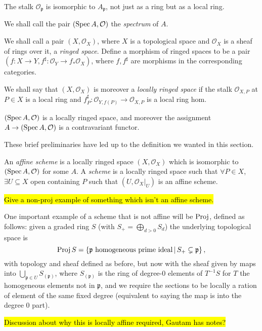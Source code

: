 \documentclass[000-main.tex]{subfiles}
\begin{document}
\begin{lemma}
  The stalk $\mathcal{O}_{\mathfrak{p}}$ is isomorphic to $A_{\mathfrak{p}}$, not just as a ring but as a local ring.
\end{lemma}

We shall call the pair $(\operatorname{Spec} A, \mathcal{O})$ the \emph{spectrum} of $A$. 

\begin{definition}
  We shall call a pair $(X, \mathcal{O}_X)$, where $X$ is a topological space and $\mathcal{O}_X$ is a sheaf of rings over it, a \emph{ringed space}.
  Define a morphism of ringed spaces to be a pair $(f : X \to Y, f^\sharp : \mathcal{O}_Y \to f_\ast \mathcal{O}_X)$, where $f, f^\sharp$ are morphisms in the corresponding categories.

  We shall say that $(X, \mathcal{O}_X)$ is moreover a \emph{locally ringed space} if the stalk $\mathcal{O}_{X, P}$ at $P \in X$ is a local ring and $f^\sharp_P : \mathcal{O}_{Y, f(P)} \to \mathcal{O}_{X, P}$ is a local ring hom.
\end{definition}

\begin{example}
  $(\operatorname{Spec} A, \mathcal{O})$ is a locally ringed space, and moreover the assignment $A \to (\operatorname{Spec} A , \mathcal{O})$ is a contravariant functor.
\end{example}

These brief preliminaries have led up to the definition we wanted in this section. 

\begin{definition}
  An \emph{affine scheme} is a locally ringed space $(X, \mathcal{O}_X)$ which is isomorphic to $(\operatorname{Spec} A, \mathcal{O})$ for some $A$.
  A \emph{scheme} is a locally ringed space such that $\forall P \in X$, $\exists U \subseteq X$ open containing $P$ such that $(U, \left . \mathcal{O}_X \right \rvert_{U})$ is an affine scheme.
\end{definition}

\begin{example}
  \hl{Give a non-proj example of something which isn't an affine scheme.}
\end{example}

One important example of a scheme that is not affine will be $\operatorname{Proj}$, defined as follows: given a graded ring $S$ (with $S_+ = \bigoplus_{d > 0 } S_d$) the underlying topological space is 
\[
  \operatorname{Proj} S = \left \lbrace \mathfrak{p} \text{ homogeneous prime ideal} \, | \, S_+ \subsetneq \mathfrak{p} \right \rbrace ,
\] 
with topology and sheaf defined as before, but now with the sheaf given by maps into $\bigcup_{\mathfrak{p} \in U} S_{(\mathfrak{p})}$, where $S_{(\mathfrak{p})}$ is the ring of degree-0 elements of $T^{-1}S$ for $T$ the homogeneous elements not in $\mathfrak{p}$, and we require the sections to be locally a ration of element of the same fixed degree (equivalent to saying the map is into the degree 0 part). 

\hl{Discussion about why this is locally affine required, Gautam has notes?} 
\end{document}

